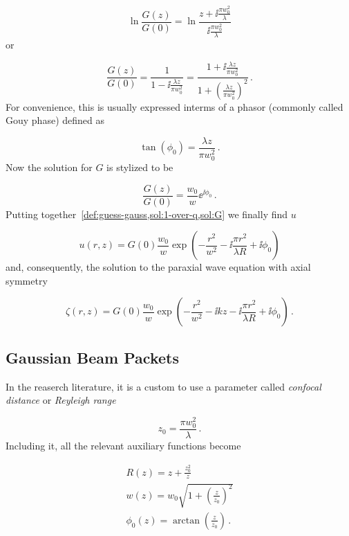 \documentclass[12pt, class=report, crop=false]{standalone}
\begin{document}
\begin{equation*}
  \ln{\frac{G(z)}{G(0)}} = \ln{\frac{z+\ii \frac{\pi w_0^2}{\lambda}}{\ii \frac{\pi w_0^2}{\lambda}}}
\end{equation*}
or

\begin{equation}
  \frac{G(z)}{G(0)} = \frac{1}{1 - \ii \frac{\lambda z}{\pi w_0^2}} = \frac{1 + \ii \frac{\lambda z}{\pi w_0^2}}{1 +\left(\frac{\lambda z}{\pi w_0^2}\right)^2}\,.
\end{equation}
For convenience, this is usually expressed interms of a phasor (commonly called Gouy phase) defined as

\begin{equation}
  \tan(\phi_0) = \frac{\lambda z}{\pi w_0^2}\,.
\end{equation}
Now the solution for \(G\) is stylized to be

\begin{equation}
  \label{sol:G}
  \frac{G(z)}{G(0)} = \frac{w_0}{w} \ee^{\ii \phi_0}\,.
\end{equation}
Putting together~\cref{def:guess-gauss,sol:1-over-q,sol:G} we finally find \(u\)

\begin{equation}
  u(r,z) = G(0) \frac{w_0}{w} \exp(-\frac{r^2}{w^2} - \ii \frac{\pi r^2}{\lambda R} + \ii \phi_0)
\end{equation}
and, consequently, the solution to the paraxial wave equation with axial symmetry

\begin{equation}
  \label{sol:final}
  \zeta(r,z) = G(0)\frac{w_0}{w} \exp(-\frac{r^2}{w^2}  -\ii k z -\ii \frac{\pi r^2}{\lambda R} + \ii \phi_0)\,.
\end{equation}

\subsection{Gaussian Beam Packets}

In the reaserch literature, it is a custom to use a parameter called \textit{confocal distance} or \textit{Reyleigh range}

\begin{equation}
  z_0=\frac{\pi w_0^2}{\lambda} \,.
\end{equation}
Including it, all the relevant auxiliary functions become

\begin{subequations}
  \begin{align}
    R(z) = z+\frac{z_0^2}{z} \\
    w(z) = w_0 \sqrt{1+\left( \frac{z}{z_0}\right)^2}\\
    \phi_0 (z) = \arctan(\frac{z}{z_0}) \,.
  \end{align}
\end{subequations}
\end{document}
